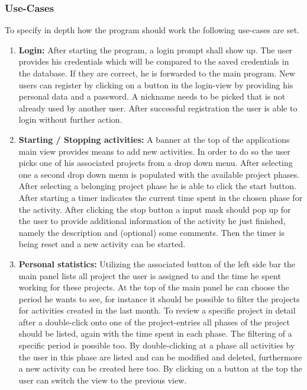 \subsubsection{Use-Cases}
To specify in depth how the program should work the following use-cases are set.
\begin{enumerate}
\item \textbf{Login:} After starting the program, a login prompt shall show up. The user provides his credentials which will be compared to the saved credentials in the database. If they are correct, he is forwarded to the main program. New users can register by clicking on a button in the login-view by providing his personal data and a password. A nickname needs to be picked that is not already used by another user. After successful registration the user is able to login without further action.

\item \textbf{Starting / Stopping activities:} A banner at the top of the applications main view provides means to add new activities. In order to do so the user picks one of his associated projects from a drop down menu. After selecting one a second drop down menu is populated with the available project phases. After selecting a belonging project phase he is able to click the start button. After starting a timer indicates the current time spent in the chosen phase for the activity. After clicking the stop button a input mask should pop up for the user to provide additional information of the activity he just finished, namely the description and (optional) some comments. Then the timer is being reset and a new activity can be started. 

\item \textbf{Personal statistics:} Utilizing the associated button of the left side bar the main panel lists all project the user is assigned to and the time he spent working for these projects. At the top of the main panel he can choose the period he wants to see, for instance it should be possible to filter the projects for activities created in the last month. To review a specific project in detail after a double-click onto one of the project-entries all phases of the project should be listed, again with the time spent in each phase. The filtering of a specific period is possible too. By double-clicking at a phase all activities by the user in this phase are listed and can be modified and deleted, furthermore a new activity can be created here too. By clicking on a button at the top the user can switch the view to the previous view.


\end{enumerate}

